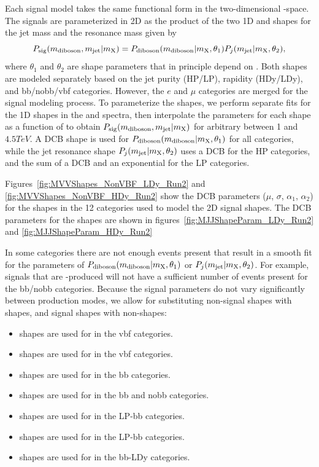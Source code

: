 Each signal model takes the same functional form in the two-dimensional \MJ-\MVV space.
The signals are parameterized in 2D as the product of the two 1D \MJ and \MVV shapes for the jet mass and the resonance mass given by
\begin{equation}
  P_\mathrm{sig}(m_\mathrm{diboson},m_\mathrm{jet}|m_\mathrm{X})=P_\mathrm{diboson}(m_\mathrm{diboson}|m_\mathrm{X},\theta_1)P_j(m_\mathrm{jet}|m_\mathrm{X},\theta_2),
\end{equation}
where $\theta_1$ and $\theta_2$ are shape parameters that in principle depend on \MX.
Both shapes are modeled separately based on the jet purity (HP/LP), rapidity (HDy/LDy), and bb/nobb/vbf categories.
However, the $e$ and $\mu$ categories are merged for the signal modeling process.
To parameterize the shapes, we perform separate fits for the 1D shapes in the \MVV and \MJ spectra, then interpolate the parameters for each shape as a function of \MX to obtain $P_\mathrm{sig}(m_\mathrm{diboson},m_\mathrm{jet}|m_\mathrm{X})$ for arbitrary \MX between 1 and $4.5\unit{TeV}$.
A DCB shape is used for $P_\mathrm{diboson}(m_\mathrm{diboson}|m_\mathrm{X},\theta_1)$ for all categories, while the jet resonance shape $P_j(m_\mathrm{jet}|m_\mathrm{X},\theta_2)$ uses a DCB for the HP categories, and the sum of a DCB and an exponential for the LP categories.

Figures~\ref{fig:MVVShapes_NonVBF_LDy_Run2} and \ref{fig:MVVShapes_NonVBF_HDy_Run2} show the DCB parameters ($\mu$, $\sigma$, $\alpha_1$, $\alpha_2$) for the \MVV shapes in the 12 categories used to model the 2D signal shapes.
The DCB parameters for the \MJ shapes are shown in figures~\ref{fig:MJJShapeParam_LDy_Run2} and \ref{fig:MJJShapeParam_HDy_Run2}

In some categories there are not enough events present that result in a smooth fit for the parameters of $P_\mathrm{diboson}(m_\mathrm{diboson}|m_\mathrm{X},\theta_1)$ or $P_j(m_\mathrm{jet}|m_\mathrm{X},\theta_2)$.
For example, signals that are \VBF-produced will not have a sufficient number of events present for the bb/nobb categories.
Because the signal parameters do not vary significantly between production modes, we allow for substituting non-\VBF signal shapes with \VBF shapes, and \VBF signal shapes with non-\VBF shapes:
\begin{itemize}
  \item \VBF\ZprtoWW shapes are used for \DY\ZprtoWW in the vbf categories.
  \item \VBF\WprtoWZ shapes are used for \DY\WprtoWZ in the vbf categories.
  \item \ggF\GBulktoWW shapes are used for \VBF\GBulktoWW in the bb categories.
  \item \DY\WprtoWZ shapes are used for \VBF\WprtoWZ in the bb and nobb categories.
  \item \ggF\RadtoWW shapes are used for \VBF\RadtoWW in the LP-bb categories.
  \item \ggF\GBulktoWW \MJ shapes are used for \DY\ZprtoWW \MJ in the LP-bb categories.
  \item \DY\ZprtoWW shapes are used for \VBF\ZprtoWW in the bb-LDy categories.
\end{itemize}

